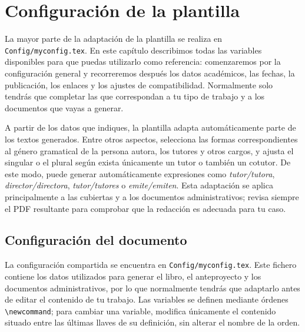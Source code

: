 %

\chapter{Configuración de la plantilla}
\label{cha:configuracion}

La mayor parte de la adaptación de la plantilla se realiza en \texttt{Config/myconfig.tex}. En este capítulo describimos todas las variables disponibles para que puedas utilizarlo como referencia: comenzaremos por la configuración general y recorreremos después los datos académicos, las fechas, la publicación, los enlaces y los ajustes de compatibilidad. Normalmente solo tendrás que completar las que correspondan a tu tipo de trabajo y a los documentos que vayas a generar.

A partir de los datos que indiques, la plantilla adapta automáticamente parte de los textos generados. Entre otros aspectos, selecciona las formas correspondientes al género gramatical de la persona autora, los tutores y otros cargos, y ajusta el singular o el plural según exista únicamente un tutor o también un cotutor. De este modo, puede generar automáticamente expresiones como \emph{tutor/tutora}, \emph{director/directora}, \emph{tutor/tutores} o \emph{emite/emiten}. Esta adaptación se aplica principalmente a las cubiertas y a los documentos administrativos; revisa siempre el PDF resultante para comprobar que la redacción es adecuada para tu caso.

\section{Configuración del documento}
\label{sec:definicion-del-tipo}

La configuración compartida se encuentra en \texttt{Config/myconfig.tex}. Este fichero contiene los datos utilizados para generar el libro, el anteproyecto y los documentos administrativos, por lo que normalmente tendrás que adaptarlo antes de editar el contenido de tu trabajo. Las variables se definen mediante órdenes \texttt{\textbackslash{}newcommand}; para cambiar una variable, modifica únicamente el contenido situado entre las últimas llaves de su definición, sin alterar el nombre de la orden.

